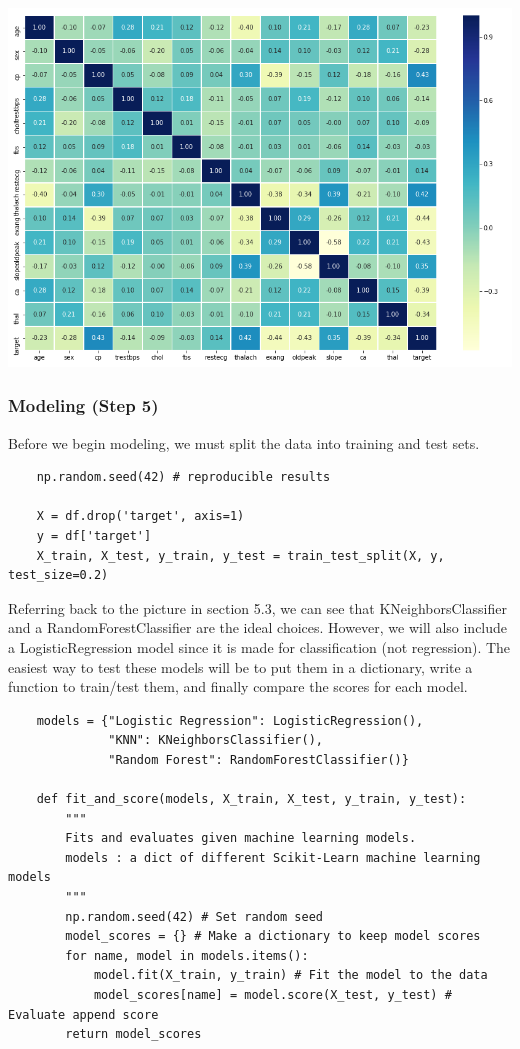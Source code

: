 \documentclass[11pt, a4paper]{article}
\begin{document}
\begin{spacing}{1.1}
	\includegraphics[scale=.75]{heat_hd} \newpage

	\subsubsection{Modeling (Step 5)}
	Before we begin modeling, we must split the data into training and test sets. 
	\begin{lstlisting}
	np.random.seed(42) # reproducible results
	
	X = df.drop('target', axis=1)
	y = df['target']
	X_train, X_test, y_train, y_test = train_test_split(X, y, test_size=0.2) \end{lstlisting} \vspace*{1mm}
	Referring back to the picture in section 5.3, we can see that KNeighborsClassifier and a RandomForestClassifier are the ideal choices. However, we will also include a LogisticRegression model since it is made for classification (not regression). The easiest way to test these models will be to put them in a dictionary, write a function to train/test them, and finally compare the scores for each model.
	\begin{lstlisting}
	models = {"Logistic Regression": LogisticRegression(),
	          "KNN": KNeighborsClassifier(),
	          "Random Forest": RandomForestClassifier()}
	
	def fit_and_score(models, X_train, X_test, y_train, y_test):
		"""
		Fits and evaluates given machine learning models.
		models : a dict of different Scikit-Learn machine learning models
		"""
		np.random.seed(42) # Set random seed
		model_scores = {} # Make a dictionary to keep model scores
		for name, model in models.items():
			model.fit(X_train, y_train) # Fit the model to the data
			model_scores[name] = model.score(X_test, y_test) # Evaluate append score
		return model_scores
	

\end{lstlisting}
\end{spacing}
\end{document}
